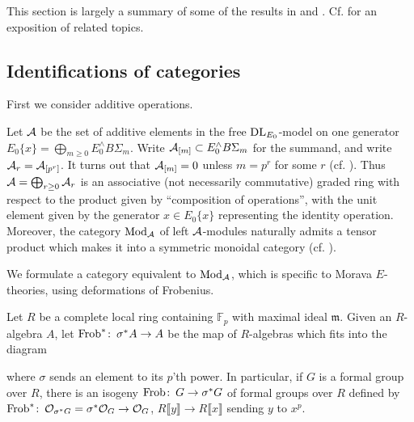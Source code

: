 \documentclass{gtpart}
\theoremstyle{definition}
\theoremstyle{remark}
\def\co{\colon\thinspace}
\newcommand{\mb}[1]{\mathbb{#1}}
\newcommand{\mf}[1]{\mathfrak{#1}}
\newcommand{\DL}{{\rm DL}}
\newcommand{\CA}{{\cal A}}
\newcommand{\Mod}{{\rm Mod}}
\newcommand{\Frob}{{\rm Frob}}
\newcommand{\CO}{{\cal O}}
\begin{document}
This section is largely a summary of some of the results in \cite[section 16]{lpo} 
and \cite[sections 3 and 4]{h2p2}.  Cf. \cite{slides} for an exposition of related topics.  

\subsection{Identifications of categories}
\label{subsec:id}

First we consider additive operations.  

Let $\CA$ be the set of 
additive elements in the free $\DL_{E_0}$-model on one generator 
$E_0\{x\} = \bigoplus_{m \geq 0} E_0^\wedge B\Sigma_m$.  Write 
$\CA_{[m]} \subset E_0^\wedge B\Sigma_m$ for the summand, and write 
$\CA_r = \CA_{[p^r]}$.  It turns out that $\CA_{[m]} = 0$ unless 
$m = p^r$ for some $r$ (cf. \cite[lemma 8.10]{strickland}).  Thus 
$\CA = \bigoplus_{r \geq 0} \CA_r$ is an associative (not necessarily 
commutative) graded ring with respect to the product given by ``composition 
of operations'', with the unit element given by the generator 
$x \in E_0\{x\}$ representing the identity operation.  Moreover, the 
category $\Mod_\CA$ of left $\CA$-modules naturally admits a tensor 
product which makes it into a symmetric monoidal category (cf. \cite[proposition 7.6]{lpo}).  

We formulate a category equivalent to $\Mod_\CA$, which is specific to 
Morava $E$-theories, using deformations of Frobenius.  

Let $R$ be a 
complete local ring containing ${\mb F}_p$ with maximal ideal $\mf m$.  Given an $R$-algebra $A$, let $\Frob^*\co \sigma^*A \to A$ be the 
map of $R$-algebras which fits into the diagram 
\begin{center}
\end{center}
where $\sigma$ sends an element to its $p$'th power.  In particular, if 
$G$ is a formal group over $R$, there is an isogeny 
$\Frob\co G \to \sigma^*G$ of formal groups over $R$ defined by 
$\Frob^*\co \CO_{\sigma^*G} = \sigma^*\CO_G \to \CO_G$, 
$R \llbracket y \rrbracket \to R \llbracket x \rrbracket$ sending $y$ to 
$x^p$.  
\end{document}
